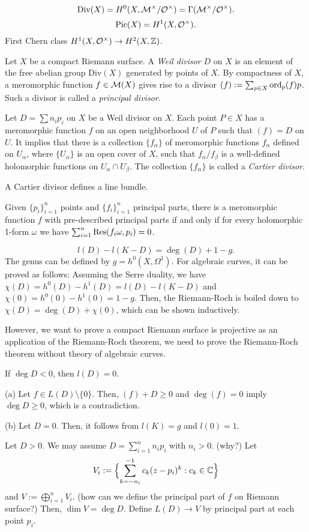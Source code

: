 \documentclass{../../large}
\begin{document}
\[\mathrm{Div}(X)=H^0(X,\mathcal{M}^\times/\mathcal{O}^\times)=\Gamma(\mathcal{M}^\times/\mathcal{O}^\times).\]
\[\mathrm{Pic}(X)=H^1(X,\mathcal{O}^\times).\]
First Chern class $H^1(X,\mathcal{O}^\times)\to H^2(X,\mathbb{Z})$.


\begin{prb}
Let $X$ be a compact Riemann surface.
A \emph{Weil divisor} $D$ on $X$ is an element of the free abelian group $\mathrm{Div}(X)$ generated by points of $X$.
By compactness of $X$, a meromorphic function $f\in\mathcal{M}(X)$ gives rise to a divisor $(f):=\sum_{p\in X}\operatorname{ord}_p(f)p$.
Such a divisor is called a \emph{principal divisor}.

Let $D=\sum n_ip_i$ on $X$ be a Weil divisor on $X$.
Each point $P\in X$ has a meromorphic function $f$ on an open neighborhood $U$ of $P$ such that $(f)=D$ on $U$.
It implies that there is a collection $\{f_\alpha\}$ of meromorphic functions $f_\alpha$ defined on $U_\alpha$, where $\{U_\alpha\}$ is an open cover of $X$, such that $f_\alpha/f_\beta$ is a well-defined holomorphic functions on $U_\alpha\cap U_\beta$.
The collection $\{f_\alpha\}$ is called a \emph{Cartier divisor}.

A Cartier divisor defines a line bundle.
\end{prb}

\begin{prb}
Given $\{p_i\}_{i=1}^n$ points and $\{f_i\}_{i=1}^n$ principal parts, there is a meromorphic function $f$ with pre-described principal parts if and only if for every holomorphic 1-form $\omega$ we have $\sum_{i=1}^n\operatorname*{Res}(f_i\omega,p_i)=0$.
\end{prb}

\begin{prb}
\[l(D)-l(K-D)=\deg(D)+1-g.\]
The genus can be defined by $g=h^0(X,\Omega^1)$.
For algebraic curves, it can be proved as follows:
Assuming the Serre duality, we have $\chi(D)=h^0(D)-h^1(D)=l(D)-l(K-D)$ and $\chi(0)=h^0(0)-h^1(0)=1-g$.
Then, the Riemann-Roch is boiled down to $\chi(D)=\deg(D)+\chi(0)$, which can be shown inductively.

However, we want to prove a compact Riemann surface is projective as an application of the Riemann-Roch theorem, we need to prove the Riemann-Roch theorem without theory of algebraic curves.
\begin{parts}
\item If $\deg D<0$, then $l(D)=0$.
\end{parts}
\end{prb}
\begin{pf}
(a)
Let $f\in L(D)\setminus\{0\}$.
Then, $(f)+D\ge0$ and $\deg(f)=0$ imply $\deg D\ge0$, which is a contradiction.

(b)
Let $D=0$.
Then, it follows from $l(K)=g$ and $l(0)=1$.

Let $D>0$.
We may assume $D=\sum_{i=1}^nn_ip_i$ with $n_i>0$. (why?)
Let
\[V_i:=\Bigl\{\sum_{k=-n_i}^{-1}c_k(z-p_i)^k:c_k\in\mathbb{C}\Bigr\}\]
and $V:=\bigoplus_{i=1}^nV_i$. (how can we define the principal part of $f$ on Riemann surface?)
Then, $\dim V=\deg D$.
Define $L(D)\to V$ by principal part at each point $p_i$.


\end{pf}
\end{document}
